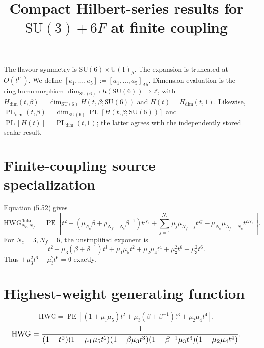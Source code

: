 \documentclass[10pt]{article}
\title{Compact Hilbert-series results for $\mathrm{SU(3)}+6F$ at finite coupling}
\date{}
\newcommand{\PE}{\operatorname{PE}}
\begin{document}
\maketitle
The flavour symmetry is $\mathrm{SU}(6)\times\mathrm{U}(1)_{\beta}$.
The expansion is truncated at $O(t^{11})$.  We define
$[a_1,\ldots,a_{5}]:=[a_1,\ldots,a_{5}]_{A5}$.
Dimension evaluation is the ring homomorphism
$\dim_{\mathrm{SU}(6)}:R(\mathrm{SU}(6))\to\mathbb{Z}$, with
$H_{\mathrm{dim}}(t,\beta)=\dim_{\mathrm{SU}(6)}H(t,\beta;\mathrm{SU}(6))$
and $H(t)=H_{\mathrm{dim}}(t,1)$. Likewise,
$\operatorname{PL}_{\mathrm{dim}}(t,\beta)=\dim_{\mathrm{SU}(6)}
\operatorname{PL}[H(t,\beta;\mathrm{SU}(6))]$ and
$\operatorname{PL}[H(t)]=\operatorname{PL}_{\mathrm{dim}}(t,1)$;
the latter agrees with the independently stored scalar result.
\section{Finite-coupling source specialization}
Equation (5.52) gives
\[\mathrm{HWG}^{\mathrm{finite}}_{N_c,N_f}=\PE\!\left[t^2+(\mu_{N_c}\beta+\mu_{N_f-N_c}\beta^{-1})t^{N_c}+\sum_{j=1}^{N_c}\mu_j\mu_{N_f-j}t^{2j}-\mu_{N_c}\mu_{N_f-N_c}t^{2N_c}\right].\]
For $N_c=3,N_f=6$, the unsimplified exponent is
\[t^2+\mu_3(\beta+\beta^{-1})t^3+\mu_1\mu_5t^2+\mu_2\mu_4t^4+\mu_3^2t^6-\mu_3^2t^6.\]
Thus $+\mu_3^2t^6-\mu_3^2t^6=0$ exactly.


\section{Highest-weight generating function}
\begin{equation}
\mathrm{HWG}=\PE\!\left[(1+\mu_1\mu_5)t^2
+\mu_3(\beta+\beta^{-1})t^3+\mu_2\mu_4t^4\right].
\end{equation}
\begin{equation}
\resizebox{0.98\linewidth}{!}{${\displaystyle
\mathrm{HWG}=\frac{1}{(1-t^2)(1-\mu_1\mu_5t^2)(1-\beta\mu_3t^3)
(1-\beta^{-1}\mu_3t^3)(1-\mu_2\mu_4t^4)}.}$}
\end{equation}
\end{document}
